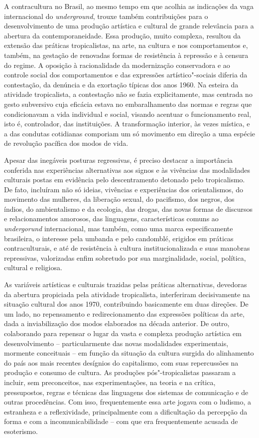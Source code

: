 A contracultura no Brasil, ao mesmo tempo em que acolhia as indicações
da vaga internacional do \emph{underground}, trouxe também contribuições
para o desenvolvimento de uma produção artística e cultural de grande
relevância para a abertura da contemporaneidade. Essa produção, muito
complexa, resultou da extensão das práticas tropicalistas, na arte, na
cultura e nos comportamentos e, também, na gestação de renovadas formas
de resistência à repressão e à censura do regime. A oposição à
racionalidade da modernização conservadora e ao controle social dos
comportamentos e das expressões artístico"-sociais diferia da
contestação, da denúncia e da exortação típicas dos anos 1960. Na
esteira da atividade tropicalista, a contestação não se fazia
explicitamente, mas centrada no gesto subversivo cuja eficácia estava no
embaralhamento das normas e regras que condicionavam a vida individual e
social, visando acentuar o funcionamento real, isto é, controlador, das
instituições. A transformação interior, às vezes mística, e a das
condutas cotidianas comporiam um só movimento em direção a uma espécie
de revolução pacífica dos modos de vida.

Apesar das inegáveis posturas regressivas, é preciso destacar a
importância conferida nas experiências alternativas aos signos e às
vivências das modalidades culturais postas em evidência pelo
descentramento detonado pelo tropicalismo. De fato, incluíram não só
ideias, vivências e experiências dos orientalismos, do movimento das
mulheres, da liberação sexual, do pacifismo, dos negros, dos índios, do
ambientalismo e da ecologia, das drogas, das novas formas de discursos e
relacionamentos amorosos, das linguagens, características comuns ao
\emph{undergorund} internacional, mas também, como uma marca
especificamente brasileira, o interesse pela umbanda e pelo candomblé,
erigidos em práticas contraculturais, e até de resistência à cultura
institucionalizada e suas manobras repressivas, valorizadas enfim
sobretudo por sua marginalidade, social, política, cultural e religiosa.

As variáveis artísticas e culturais trazidas pelas práticas
alternativas, devedoras da abertura propiciada pela atividade
tropicalista, interferiram decisivamente na situação cultural dos anos
1970, contribuindo basicamente em duas direções. De um lado, no
repensamento e redirecionamento das expressões políticas da arte, dada a
inviabilização dos modos elaborados na década anterior. De outro,
colaborando para repensar o lugar da vasta e complexa produção artística
em desenvolvimento -- particularmente das novas modalidades
experimentais, mormente conceituais -- em função da situação da cultura
surgida do alinhamento do país aos mais recentes desígnios do
capitalismo, com suas repercussões na produção e consumo de cultura. As
produções pós"-tropicalistas passaram a incluir, sem preconceitos, nas
experimentações, na teoria e na crítica, pressupostos, regras e técnicas
das linguagens dos sistemas de comunicação e de outras procedências. Com
isso, frequentemente essa arte jogava com o ludismo, a estranheza e a
reflexividade, principalmente com a dificultação da percepção da forma e
com a incomunicabilidade -- com que era frequentemente acusada de
esoterismo.

